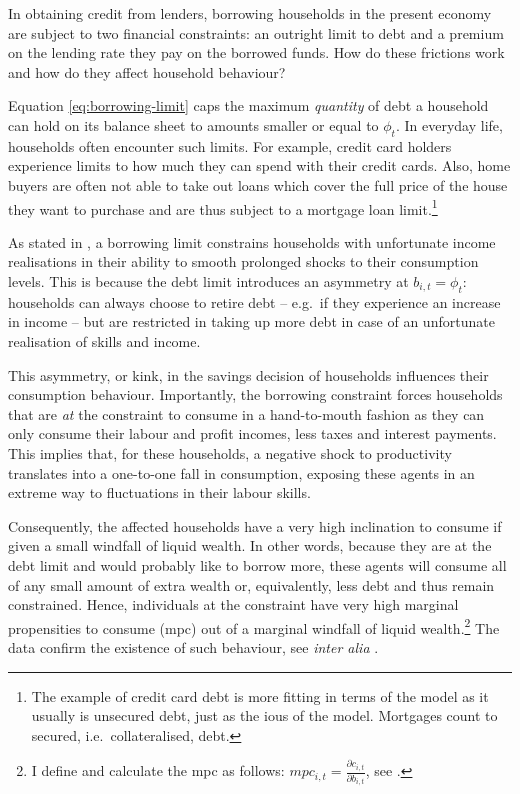 \documentclass[12pt]{article} %
\numberwithin{equation}{section} %
\begin{document}
In obtaining credit from lenders, borrowing households in the present economy are subject to two financial constraints: an outright limit to debt and a premium on the lending rate they pay on the borrowed funds. How do these frictions work and how do they affect household behaviour?

Equation \eqref{eq:borrowing-limit} caps the maximum \textit{quantity} of debt a household can hold on its balance sheet to amounts smaller or equal to $\phi_t$. In everyday life, households often encounter such limits. For example, credit card holders experience limits to how much they can spend with their credit cards. Also, home buyers are often not able to take out loans which cover the full price of the house they want to purchase and are thus subject to a mortgage loan limit.\footnote{The example of credit card debt is more fitting in terms of the model as it usually is unsecured debt, just as the \Gls{iou}s of the model. Mortgages count to secured, i.e.~collateralised, debt.}

As stated in \textcite{carroll2021}, a borrowing limit constrains households with unfortunate income realisations in their ability to smooth prolonged shocks to their consumption levels. This is because the debt limit introduces an asymmetry at $b_{i,t} = \phi_t$: households can always choose to retire debt -- e.g.~if they experience an increase in income -- but are restricted in taking up more debt in case of an unfortunate realisation of skills and income. 

This asymmetry, or kink, in the savings decision of households influences their consumption behaviour. Importantly, the borrowing constraint forces households that are \textit{at} the constraint to consume in a hand-to-mouth fashion as they can only consume their labour and profit incomes, less taxes and interest payments. This implies that, for these households, a negative shock to productivity translates into a one-to-one fall in consumption, exposing these agents in an extreme way to fluctuations in their labour skills. 

Consequently, the affected households have a very high inclination to consume if given a small windfall of liquid wealth. In other words, because they are at the debt limit and would probably like to borrow more, these agents will consume all of any small amount of extra wealth or, equivalently, less debt and thus remain constrained. Hence, individuals at the constraint have very high marginal propensities to consume (\Gls{mpc}) out of a marginal windfall of liquid wealth.\footnote{I define and calculate the \Gls{mpc} as follows: $mpc_{i,t} = \frac{\partial c_{i,t}}{\partial b_{i,t}}$, see \textcite{gl2017}.} The data confirm the existence of such behaviour, see \textit{inter alia} \textcite{gross2002}.
\end{document}
